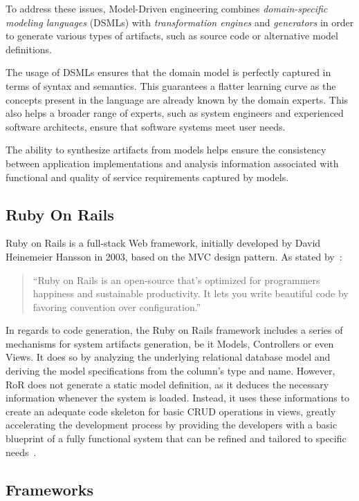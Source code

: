 To address these issues, Model-Driven engineering combines \emph{domain-specific modeling languages} (DSMLs) with \emph{transformation engines} and \emph{generators} in order to generate various types of artifacts, such as source code or alternative model definitions.

The usage of DSMLs ensures that the domain model is perfectly captured in terms of syntax and semantics. This guarantees a flatter learning curve as the concepts present in the language are already known by the domain experts. This also helps a broader range of experts, such as system engineers and experienced software architects, ensure that software systems meet user needs.

The ability to synthesize artifacts from models helps ensure the consistency between application implementations and analysis information associated with functional and quality of service requirements captured by models.

\subsection{Ruby On Rails}\label{sec:ror}

Ruby on Rails is a full-stack Web framework, initially developed by David Heinemeier Hansson in 2003, based on the MVC design pattern. As stated by~\cite{rubyonrails}:

\begin{quote}
  ``Ruby on Rails is an open-source that's optimized for programmers happiness and sustainable productivity. It lets you write beautiful code by favoring convention over configuration.''
\end{quote}

In regards to code generation, the Ruby on Rails framework includes a series of mechanisms for system artifacts generation, be it Models, Controllers or even Views. It does so by analyzing the underlying relational database model and deriving the model specifications from the column's type and name. However, RoR does not generate a static model definition, as it deduces the necessary information whenever the system is loaded. Instead, it uses these informations to create an adequate code skeleton for basic CRUD operations in views, greatly accelerating the development process by providing the developers with a basic blueprint of a fully functional system that can be refined and tailored to specific needs~\cite{rails_generators}.

\subsection{Frameworks}\label{sec:frameworks}

